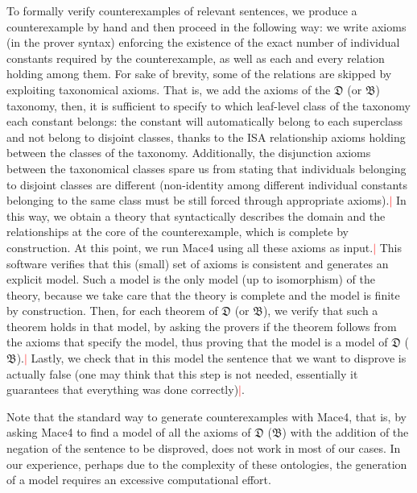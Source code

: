 \documentclass[ao]{iosart2x}
\newcommand{\nb}[1]{\textcolor{red}{$|$}\marginpar{\hspace*{-0cm}\parbox{20mm}{\scriptsize\raggedright\textcolor{red}{#1}}}}
\newcommand {\thdolce} {\ensuremath{\mathfrak{D}}}
\newcommand {\thbfo} {\ensuremath{\mathfrak{B}}}
\begin{document}
To formally verify counterexamples of relevant sentences, we produce a counterexample by hand and then proceed in the following way: we write axioms (in the prover syntax) enforcing the existence of the exact number of individual constants required by the counterexample, as well as each and every relation holding among them. 
For sake of brevity, some of the relations are skipped by exploiting taxonomical axioms. That is, we add the axioms of the {$\thdolce$} (or  {$\thbfo$}) taxonomy, %
then, it is sufficient to specify to which leaf-level class of the taxonomy each constant belongs: the constant will automatically belong to each superclass and not belong to disjoint classes, thanks to the ISA relationship axioms holding between the classes of the taxonomy. Additionally, the disjunction axioms between the taxonomical classes spare us from stating that individuals belonging to disjoint classes are different (non-identity among different individual constants belonging to the same class must be still forced through appropriate axioms).\nb{CM: non ho capito questo, non è possibile avere due costanti dello stesso tipo foglia? FC: riscritto} In this way, we obtain a theory that syntactically describes the domain and the relationships at the core of the counterexample, which is complete by construction. 
At this point, we run Mace4 using all these axioms as input.\nb{CM: è vero questo? mi ricordavo che facevamo andare solo il prover FC: lo facevo girare senza i teoremi, prima divfar girare i prover} This software verifies that this (small) set of axioms is consistent and generates an explicit model.
Such a model is the only model (up to isomorphism) of the theory, because we take care that the theory is complete and the model is finite by construction.
Then, for each theorem of {$\thdolce$} (or $\thbfo$), we verify that such a theorem holds in that model, by asking the provers if the theorem follows from the axioms that specify the model, thus proving that the model is a model of {$\thdolce$} ($\thbfo$).\nb{SB: il testo era ambiguo e ho cambiato, controllate} 
Lastly, we check that in this model the sentence that we want to disprove is actually false (one may think that this step is not needed, essentially it guarantees that everything was done correctly)\nb{FC: in che senso non serve? O si verica a mano che è un contromodello o si verifica in automatic. A me non verrebbe da pensare che questo passo non serve.}.

Note that the standard way to generate counterexamples with Mace4, that is, by asking Mace4 to find a model of all the axioms of {$\thdolce$} ($\thbfo$) with the addition of the negation of the sentence to be disproved, does not work in most of our cases. In our experience, perhaps due to the complexity of these ontologies, the generation of a model requires an excessive computational effort.
\end{document}
